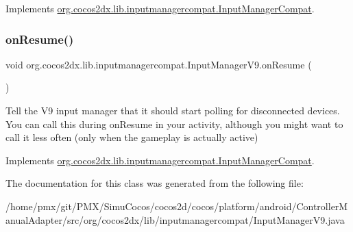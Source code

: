 Implements \hyperlink{interfaceorg_1_1cocos2dx_1_1lib_1_1inputmanagercompat_1_1InputManagerCompat_a8ce6170ffd23cf2a18374c271939ac1e}{org.\+cocos2dx.\+lib.\+inputmanagercompat.\+Input\+Manager\+Compat}.

\mbox{\label{classorg_1_1cocos2dx_1_1lib_1_1inputmanagercompat_1_1InputManagerV9_a94c18cf8110be2479e6cb8d9528b57d5}} 
\subsubsection{\texorpdfstring{on\+Resume()}{onResume()}\hspace{0.1cm}{\footnotesize\ttfamily [2/2]}}
{\footnotesize\ttfamily void org.\+cocos2dx.\+lib.\+inputmanagercompat.\+Input\+Manager\+V9.\+on\+Resume (\begin{DoxyParamCaption}{ }\end{DoxyParamCaption})\hspace{0.3cm}{\ttfamily [inline]}}

Tell the V9 input manager that it should start polling for disconnected devices. You can call this during on\+Resume in your activity, although you might want to call it less often (only when the gameplay is actually active) 

Implements \hyperlink{interfaceorg_1_1cocos2dx_1_1lib_1_1inputmanagercompat_1_1InputManagerCompat_a8ce6170ffd23cf2a18374c271939ac1e}{org.\+cocos2dx.\+lib.\+inputmanagercompat.\+Input\+Manager\+Compat}.



The documentation for this class was generated from the following file\+:\begin{DoxyCompactItemize}
\item 
/home/pmx/git/\+P\+M\+X/\+Simu\+Cocos/cocos2d/cocos/platform/android/\+Controller\+Manual\+Adapter/src/org/cocos2dx/lib/inputmanagercompat/Input\+Manager\+V9.\+java\end{DoxyCompactItemize}
